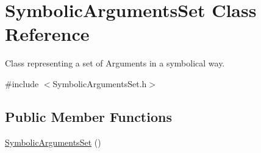 \hypertarget{classSymbolicArgumentsSet}{\section{Symbolic\-Arguments\-Set Class Reference}
\label{classSymbolicArgumentsSet}
}


Class representing a set of Arguments in a symbolical way.  




{\ttfamily \#include $<$Symbolic\-Arguments\-Set.\-h$>$}

\subsection*{Public Member Functions}
\begin{DoxyCompactItemize}
\item 
\hypertarget{classSymbolicArgumentsSet_ab0973eb5562e3e3f9e396af5e732ccf0}{\hyperlink{classSymbolicArgumentsSet_ab0973eb5562e3e3f9e396af5e732ccf0}{Symbolic\-Arguments\-Set} ()}\label{classSymbolicArgumentsSet_ab0973eb5562e3e3f9e396af5e732ccf0}


\end{DoxyCompactItemize}
